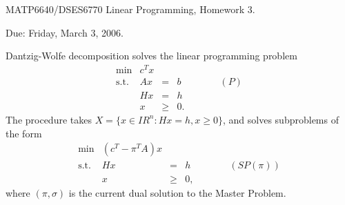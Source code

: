 \documentclass[12pt]{article}
\newcommand{\re}{I \!\! R}
\begin{document}
\begin{center}
  \begin{large}
     MATP6640/DSES6770 Linear Programming, Homework 3.
  \end{large}
\end{center}

\begin{flushright}
   Due:  Friday, March 3, 2006.
\end{flushright}

Dantzig-Wolfe decomposition solves the linear programming problem
    \begin{displaymath}
      \begin{array}{lrcl}
        \min          & c^Tx \\
        \mbox{s.t.}   &  Ax  & = & b  \qquad \qquad (P)  \\
                      &  Hx  & = & h  \\
                      &   x & \geq & 0.
      \end{array}
    \end{displaymath}
The procedure
takes $X = \{ x \in \re^n: Hx=h, x \geq 0 \}$,
and solves subproblems of the form
    \begin{displaymath} 
      \begin{array}{lccl} 
        \min          & (c^T - \pi^T A)x \\ 
        \mbox{s.t.}   &  Hx  & = & h  \qquad \qquad (SP(\pi))  \\ 
                      &   x & \geq & 0, 
      \end{array} 
    \end{displaymath}
    where $(\pi,\sigma)$ is the current dual solution to the Master Problem.

\vspace{\baselineskip}
\end{document}
